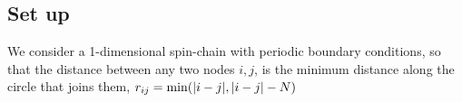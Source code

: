 %

\subsection{Set up}%
\label{sub:Set up}

We consider a 1-dimensional spin-chain with periodic boundary conditions, so that the distance between any two nodes $i, j$, is the minimum distance along the circle that joins them, $r_{ij} = \min(\lvert i - j \rvert, \lvert i-j \rvert - N)$
